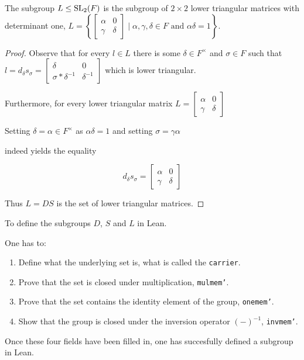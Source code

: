 \begin{remark}
    \label{mem_L_iff_lower_triangular}
    \leanok
    The subgroup $L \le \operatorname{SL}_2(F)$ is the subgroup of $2 \times 2$ lower triangular matrices with determinant one, $L =\left\{\begin{bmatrix}
    \alpha & 0\\
    \gamma & \delta
    \end{bmatrix} \; | \; \alpha, \gamma, \delta \in F \text{ and } \alpha \delta = 1 \right\}$.
\end{remark}

\begin{proof}
    Observe that for every $l \in L$ there is some $\delta \in F^\times$ and $\sigma \in F$ such that $l  = d_\delta s_\sigma = \begin{bmatrix}
        \delta & 0\\
        \sigma * \delta^{-1} & \delta^{-1}
    \end{bmatrix}$ which is lower triangular. 
    
    Furthermore, for every lower triangular matrix $L = \begin{bmatrix}
        \alpha & 0\\
        \gamma & \delta
    \end{bmatrix}$ 
    
    Setting $\delta = \alpha \in F^\times$ as $\alpha \delta = 1$ and setting $\sigma = \gamma \alpha$

    indeed yields the equality

    \[
    d_\delta s_\sigma = \begin{bmatrix}
        \alpha & 0\\
        \gamma & \delta
    \end{bmatrix}
    \]

    Thus $L = D S$ is the set of lower triangular matrices.
\end{proof}

\begin{remark}
    To define the subgroups $D$, $S$ and $L$ in Lean. 
    
    One has to:
    
    \begin{enumerate}
        \item Define what the underlying set is, what is called the \texttt{carrier}.
        \item Prove that the set is closed under multiplication, \texttt{mul\textunderscore mem'}.
        \item Prove that the set contains the identity element of the group, \texttt{one\textunderscore mem'}.
        \item Show that the group is closed under the inversion operator $(-)^{-1}$, \texttt{inv\textunderscore mem'}.
    \end{enumerate}

    Once these four fields have been filled in, one has succesfully defined a subgroup in Lean.
\end{remark}


